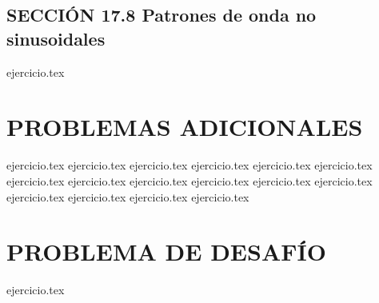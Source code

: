 \subsection*{SECCIÓN 17.8 Patrones de onda no sinusoidales}
\begin{enumerate}
    \setcounter{enumi}{32}
    {ejercicio.tex}
\end{enumerate}

\section*{PROBLEMAS ADICIONALES}
\begin{enumerate}
    \setcounter{enumi}{33}
    {ejercicio.tex}
    {ejercicio.tex}
    {ejercicio.tex}
    {ejercicio.tex}
    {ejercicio.tex}
    {ejercicio.tex}
    {ejercicio.tex}
    {ejercicio.tex}
    {ejercicio.tex}
    {ejercicio.tex}
    {ejercicio.tex}
    {ejercicio.tex}
    {ejercicio.tex}
    {ejercicio.tex}
    {ejercicio.tex}
    {ejercicio.tex}
\end{enumerate}

\section*{PROBLEMA DE DESAFÍO}
\begin{enumerate}
    \setcounter{enumi}{49}
    {ejercicio.tex}
\end{enumerate}
